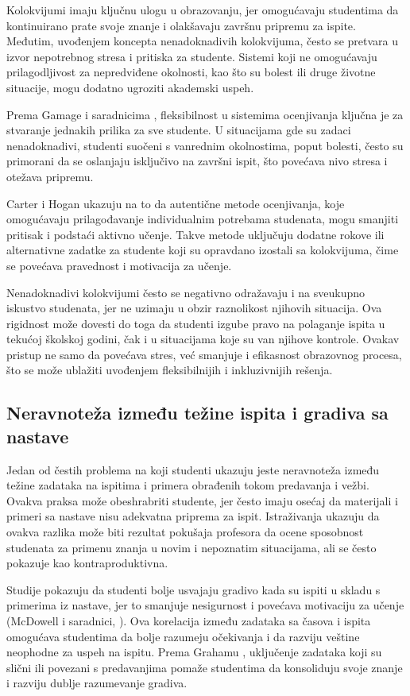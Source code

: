 \documentclass[a4paper]{article}
\begin{document}
Kolokvijumi imaju ključnu ulogu u obrazovanju, jer omogućavaju studentima da kontinuirano prate svoje znanje i olakšavaju završnu pripremu za ispite. Međutim, uvođenjem koncepta nenadoknadivih kolokvijuma, često se pretvara u izvor nepotrebnog stresa i pritiska za studente. Sistemi koji ne omogućavaju prilagodljivost za nepredviđene okolnosti, kao što su bolest ili druge životne situacije, mogu dodatno ugroziti akademski uspeh.

Prema Gamage i saradnicima \cite{gamage2022rethinking}, fleksibilnost u sistemima ocenjivanja ključna je za stvaranje jednakih prilika za sve studente. U situacijama gde su zadaci nenadoknadivi, studenti suočeni s vanrednim okolnostima, poput bolesti, često su primorani da se oslanjaju isključivo na završni ispit, što povećava nivo stresa i otežava pripremu.

Carter i Hogan \cite{carter2013authentic} ukazuju na to da autentične metode ocenjivanja, koje omogućavaju prilagođavanje individualnim potrebama studenata, mogu smanjiti pritisak i podstaći aktivno učenje. Takve metode uključuju dodatne rokove ili alternativne zadatke za studente koji su opravdano izostali sa kolokvijuma, čime se povećava pravednost i motivacija za učenje.

Nenadoknadivi kolokvijumi često se negativno odražavaju i na sveukupno iskustvo studenata, jer ne uzimaju u obzir raznolikost njihovih situacija. Ova rigidnost može dovesti do toga da studenti izgube pravo na polaganje ispita u tekućoj školskoj godini, čak i u situacijama koje su van njihove kontrole. Ovakav pristup ne samo da povećava stres, već smanjuje i efikasnost obrazovnog procesa, što se može ublažiti uvođenjem fleksibilnijih i inkluzivnijih rešenja.

\subsection{Neravnoteža između težine ispita i gradiva sa nastave}

Jedan od čestih problema na koji studenti ukazuju jeste neravnoteža između težine zadataka na ispitima i primera obrađenih tokom predavanja i vežbi. Ovakva praksa može obeshrabriti studente, jer često imaju osećaj da materijali i primeri sa nastave nisu adekvatna priprema za ispit. Istraživanja ukazuju da ovakva razlika može biti rezultat pokušaja profesora da ocene sposobnost studenata za primenu znanja u novim i nepoznatim situacijama, ali se često pokazuje kao kontraproduktivna.

Studije pokazuju da studenti bolje usvajaju gradivo kada su ispiti u skladu s primerima iz nastave, jer to smanjuje nesigurnost i povećava motivaciju za učenje (McDowell i saradnici, \cite{sambell2013assessment}). Ova korelacija između zadataka sa časova i ispita omogućava studentima da bolje razumeju očekivanja i da razviju veštine neophodne za uspeh na ispitu. Prema Grahamu \cite{graham1999practice}, uključenje zadataka koji su slični ili povezani s predavanjima pomaže studentima da konsoliduju svoje znanje i razviju dublje razumevanje gradiva.
\end{document}
